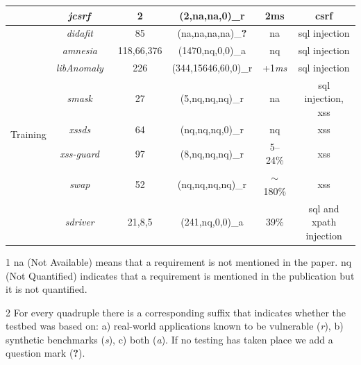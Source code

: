 \documentclass[conference]{IEEEtran}
\newcommand{\xmark}{\ding{56}}
\begin{document}
\begin{landscape}
\begin{table}
\begin{threeparttable}
\begin{small}
{\begin{tabular}{l|c|c|cc|c}
	&   {\it j{\sc csrf}}~\cite{PS11} & 2 & (2,{\sc na},{\sc na},0)\_r & 2ms & {\sc csrf} \\
	\hline
	\hline  
  \multirow{9}{*}{Training}
  &   {\it {\sc didafit}}~\cite{LLW02} & 85 & ({\sc na},{\sc na},{\sc na},{\sc na})\_{\bf ?} & {\sc na} & {\sc sql} injection \\
	&   {\it {\sc amnesia}}~\cite{HO05,HO06,HO05b} & 118,66,376 & (1470,{\sc nq},0,0)\_a & {\sc nq} & {\sc sql} injection \\ 
	&   {\it libAnomaly}~\cite{VMV05} & 226 & (344,15646,60,0)\_r & +1{\it ms} & {\sc sql} injection \\
	& 	{\it {\sc sm}ask}~\cite{JB07} & 27 & (5,{\sc nq},{\sc nq},{\sc nq})\_r  & {\sc na} & {\sc sql} injection, {\sc xss} \\
	& 	{\it {\sc xssds}}~\cite{JEP08} & 64 & ({\sc nq},{\sc nq},{\sc nq},0)\_r & {\sc nq} &  {\sc xss} \\
  & 	{\it {\sc xss-guard}}~\cite{BV08} & 97 & (8,{\sc nq},{\sc nq},{\sc nq})\_r & 5--24\% & {\sc xss} \\
  & 	{\it {\sc swap}}~\cite{WPLKK09} & 52 & ({\sc nq},{\sc nq},{\sc nq},{\sc nq})\_r & $\sim$180\% & {\sc xss} \\ 
	& 	{\it {\sc sd}river}~\cite{MS09,MKS09,MKLS11} & 21,8,5 & (241,{\sc nq},0,0)\_a & 39\% & {\sc sql} and {\sc xp}ath injection \\
	\hline
    \end{tabular}}
    \begin{tablenotes}
	\begin{footnotesize}
       	\item[1] {\sc na} (Not Available) means that a requirement is not mentioned in the paper.
	{\sc nq} (Not Quantified) indicates that a requirement is mentioned in the publication
	but it is not quantified.
		\item[2] For every quadruple there is a corresponding suffix that indicates whether the testbed was
	based on: a) real-world applications known to be vulnerable ({\it r}), b) synthetic benchmarks ({\it s}), c) both ({\it a}).
	If no testing has taken place we add a question mark ({\bf ?}).
	\end{footnotesize}
    \end{tablenotes}
    \end{small}
    \end{threeparttable}
\end{table}
\end{landscape}
\end{document}
